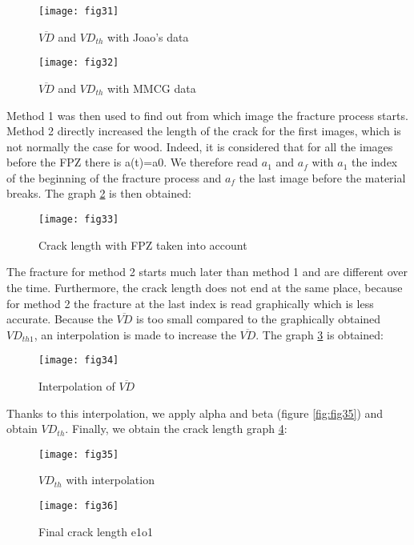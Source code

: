 \begin{figure}[htp]
	\begin{minipage}[c]{.46\linewidth}
		\centering
		\texttt{[image: fig31]}
		\caption{$\overline{VD}$ and $VD_{th}$ with Joao's data}
		\label{fig:fig31}
	\end{minipage}
	\hfill%
	\begin{minipage}[c]{.46\linewidth}
		\centering
		\texttt{[image: fig32]}
		\caption{$\overline{VD}$ and $VD_{th}$ with MMCG data}
		\label{fig:fig32}
	\end{minipage}
\end{figure}


Method 1 was then used to find out from which image the fracture process starts. Method 2 directly increased the length of the crack for the first images, which is not normally the case for wood.  Indeed, it is considered that for all the images before the FPZ there is a(t)=a0. We therefore read $a_1$ and $a_f$ with $a_1$ the index of the beginning of the fracture process and $a_f$ the last image before the material breaks. The graph \ref{fig:fig33} is then obtained:


\begin{figure}[htp]
	\centering
	\texttt{[image: fig33]}
	\caption{Crack length with FPZ taken into account}
	\label{fig:fig33}
\end{figure}

The fracture for method 2 starts much later than method 1 and are different over the time. Furthermore, the crack length does not end at the same place, because for method 2 the fracture at the last index is read graphically which is less accurate.
Because the $\overline{VD}$ is too small compared to the graphically obtained $VD_{th1}$, an interpolation is made to increase the $\overline{VD}$. The graph \ref{fig:fig34} is obtained:

\begin{figure}[htp]
	\centering
	\texttt{[image: fig34]}
	\caption{Interpolation of $\overline{VD}$}
	\label{fig:fig34}
\end{figure}

Thanks to this interpolation, we apply alpha and beta (figure \ref{fig:fig35}) and obtain $VD_{th}$. Finally, we obtain the crack length graph \ref{fig:fig36}:

\begin{figure}[h]
	\begin{minipage}[c]{.46\linewidth}
		\centering
		\texttt{[image: fig35]}
		\caption{$VD_{th}$ with interpolation}
		\label{fig:fig35}
	\end{minipage}
	\hfill%
	\begin{minipage}[c]{.46\linewidth}
		\centering
		\texttt{[image: fig36]}
		\caption{Final crack length e1o1}
		\label{fig:fig36}
	\end{minipage}
\end{figure}

